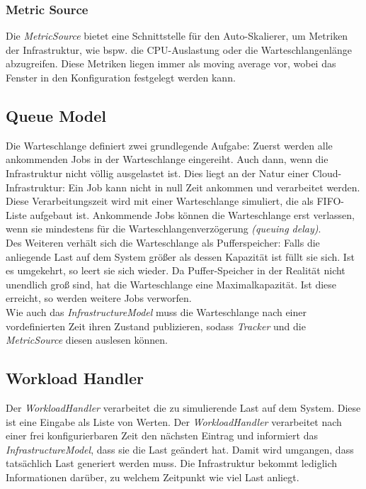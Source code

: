 \subsubsection{Metric Source}
Die \textit{MetricSource} bietet eine Schnittstelle für den Auto-Skalierer, um Metriken der Infrastruktur, wie bspw. die CPU-Auslastung oder die Warteschlangenlänge abzugreifen. Diese Metriken liegen immer als moving average vor, wobei das Fenster in den Konfiguration festgelegt werden kann.



\subsection{Queue Model}
\label{sec:aufbau:QueueModel}
Die Warteschlange definiert zwei grundlegende Aufgabe: Zuerst werden alle ankommenden Jobs in der Warteschlange eingereiht. Auch dann, wenn die Infrastruktur nicht völlig ausgelastet ist. Dies liegt an der Natur einer Cloud-Infrastruktur: Ein Job kann nicht in null Zeit ankommen und verarbeitet werden. Diese Verarbeitungszeit wird mit einer Warteschlange simuliert, die als FIFO-Liste aufgebaut ist. Ankommende Jobs können die Warteschlange erst verlassen, wenn sie mindestens für die Warteschlangenverzögerung \textit{(queuing delay)}. \\
Des Weiteren verhält sich die Warteschlange als Pufferspeicher: Falls die anliegende Last auf dem System größer als dessen Kapazität ist füllt sie sich. Ist es umgekehrt, so leert sie sich wieder. Da Puffer-Speicher in der Realität nicht unendlich groß sind, hat die Warteschlange eine Maximalkapazität. Ist diese erreicht, so werden weitere Jobs verworfen. \\
Wie auch das \textit{InfrastructureModel} muss die Warteschlange nach einer vordefinierten Zeit ihren Zustand publizieren, sodass \textit{Tracker} und die \textit{MetricSource} diesen auslesen können.

\subsection{Workload Handler}
Der \textit{WorkloadHandler} verarbeitet die zu simulierende Last auf dem System. Diese ist eine Eingabe als Liste von Werten. Der \textit{WorkloadHandler} verarbeitet nach einer frei konfigurierbaren Zeit den nächsten Eintrag und informiert das \textit{InfrastructureModel}, dass sie die Last geändert hat. Damit wird umgangen, dass tatsächlich Last generiert werden muss. Die Infrastruktur bekommt lediglich Informationen darüber, zu welchem Zeitpunkt wie viel Last anliegt. 

